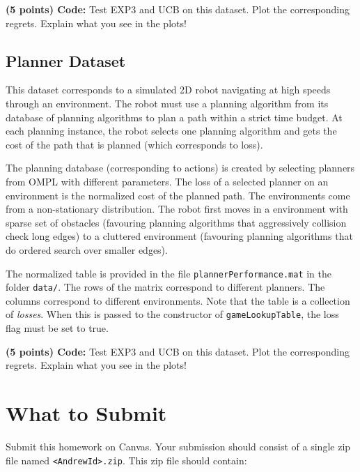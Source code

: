 \documentclass{article}
\begin{document}
\noindent\textbf{(5 points) Code:} Test EXP3 and UCB on this dataset. Plot the corresponding regrets. Explain what you see in the plots!

\subsection{Planner Dataset}

This dataset corresponds to a simulated 2D robot navigating at high speeds through an environment. The robot must use a planning algorithm from its database of planning algorithms to plan a path within a strict time budget. At each planning instance, the robot selects one planning algorithm and gets the cost of the path that is planned (which corresponds to loss). 

The planning database (corresponding to actions) is created by selecting planners from OMPL with different parameters. The loss of a selected planner on an environment is the normalized cost of the planned path. The environments come from a non-stationary distribution. The robot first moves in a environment with sparse set of obstacles (favouring planning algorithms that aggressively collision check long edges) to a cluttered environment (favouring planning algorithms that do ordered search over smaller edges). 

The normalized table is provided in the file \texttt{plannerPerformance.mat} in the folder \texttt{data/}. The rows of the matrix correspond to different planners. The columns correspond to different environments. Note that the table is a collection of \emph{losses}. When this is passed to the constructor of \texttt{gameLookupTable}, the loss flag must be set to true.

\noindent\textbf{(5 points) Code:} Test EXP3 and UCB on this dataset. Plot the corresponding regrets. Explain what you see in the plots!

\section{What to Submit}\label{sec:wts}
Submit this homework on Canvas.
Your submission should consist of a single zip file named {\tt<AndrewId>.zip}. This zip file should contain:
\end{document}
